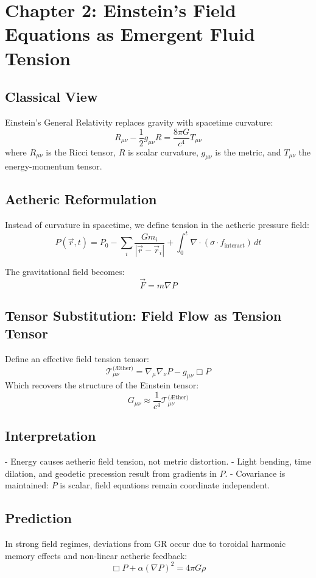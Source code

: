 \documentclass[12pt]{book}
\begin{document}
\section*{Chapter 2: Einstein’s Field Equations as Emergent Fluid Tension}

\subsection*{Classical View}
Einstein's General Relativity replaces gravity with spacetime curvature:
\[
R_{\mu\nu} - \frac{1}{2}g_{\mu\nu}R = \frac{8\pi G}{c^4}T_{\mu\nu}
\]
where $R_{\mu\nu}$ is the Ricci tensor, $R$ is scalar curvature, $g_{\mu\nu}$ is the metric, and $T_{\mu\nu}$ the energy-momentum tensor.

\subsection*{Aetheric Reformulation}
Instead of curvature in spacetime, we define tension in the aetheric pressure field:
\[
P(\vec{r}, t) = P_0 - \sum_i \frac{G m_i}{|\vec{r} - \vec{r}_i|} + \int_0^t \nabla \cdot (\sigma \cdot f_{\text{interact}}) \, dt
\]

The gravitational field becomes:
\[
\vec{F} = m \nabla P
\]

\subsection*{Tensor Substitution: Field Flow as Tension Tensor}
Define an effective field tension tensor:
\[
\mathcal{T}_{\mu\nu}^{\text{(Æther)}} = \nabla_\mu \nabla_\nu P - g_{\mu\nu} \Box P
\]
Which recovers the structure of the Einstein tensor:
\[
G_{\mu\nu} \approx \frac{1}{c^4} \mathcal{T}_{\mu\nu}^{\text{(Æther)}}
\]

\subsection*{Interpretation}
- Energy causes aetheric field tension, not metric distortion.
- Light bending, time dilation, and geodetic precession result from gradients in $P$.
- Covariance is maintained: $P$ is scalar, field equations remain coordinate independent.

\subsection*{Prediction}
In strong field regimes, deviations from GR occur due to toroidal harmonic memory effects and non-linear aetheric feedback:
\[
\Box P + \alpha (\nabla P)^2 = 4\pi G \rho
\]
\end{document}
